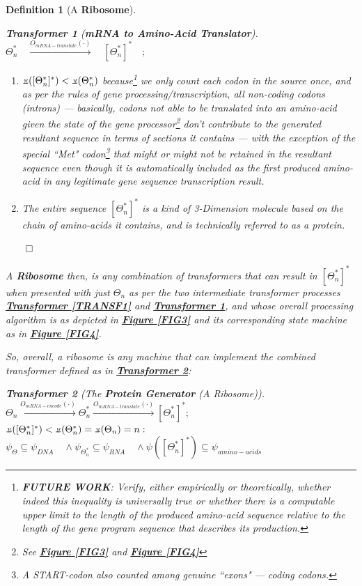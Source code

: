 \documentclass[a4paper, 18pt]{book} %
\newtheorem{defn}{Definition}
\newtheorem{transf}{Transformer}
\newcommand{\invpi}{\rotatebox[origin=c]{180}{$\pi$}}
\begin{document}
\begin{defn}[A \textbf{Ribosome}]
\begin{transf}[\textbf{mRNA to Amino-Acid Translator}]
\label{TRANSF2}
$ $\\
$\Theta^*_n \quad \xrightarrow{O_{mRNA-translate}(\cdot)} \quad [\Theta^*_n]^* \quad;$\\
\begin{enumerate}
\item $\invpi([\Theta^*_n]^*) < \invpi(\Theta^*_n)$ because\footnote{\textbf{FUTURE WORK}: Verify, either empirically or theoretically, whether indeed this inequality is universally true or whether there is a computable upper limit to the length of the produced amino-acid sequence relative to the length of the gene program sequence that describes its production.} we only count each codon in the source once, and as per the rules of gene processing/transcription, all non-coding codons (introns) --- basically, codons not able to be translated into an amino-acid given the state of the gene processor\footnote{See \textbf{\hyperref[FIG3]{Figure \ref{FIG3}}} and \textbf{\hyperref[FIG4]{Figure \ref{FIG4}}}} don't contribute to the generated resultant sequence in terms of sections it contains --- with the exception of the special ``Met" codon\footnote{A START-codon also counted among genuine ``exons" --- coding codons.} that might or might not be retained in the resultant sequence even though it is automatically included as the first produced amino-acid in any legitimate gene sequence transcription result.
\item The entire sequence $[\Theta^*_n]^*$ is a kind of 3-Dimension molecule based on the chain of amino-acids it contains, and is technically referred to as a protein.
\end{enumerate}
$\qed$
\end{transf}

A \textbf{Ribosome} then, is any combination of transformers that can result in $[\Theta^*_n]^*$ when presented with just $\Theta_n$ as per the two intermediate transformer processes \textbf{\hyperref[TRANSF1]{Transformer \ref{TRANSF1}}} and \textbf{\hyperref[TRANSF2]{Transformer \ref{TRANSF2}}}, and whose overall processing algorithm is as depicted in \textbf{\hyperref[FIG3]{Figure \ref{FIG3}}} and its corresponding state machine as in \textbf{\hyperref[FIG4]{Figure \ref{FIG4}}}. 

So, overall, a ribosome is any machine that can implement the combined transformer defined as in \textbf{\hyperref[TRANSF3]{Transformer \ref{TRANSF3}}}:

\begin{transf}[The \textbf{Protein Generator} (A Ribosome)]
\label{TRANSF3}
$ $\\
$\Theta_n  \xrightarrow{O_{mRNA-encode}(\cdot)}  \Theta^*_n  \xrightarrow{O_{mRNA-translate}(\cdot)} [\Theta^*_n]^*;$\\
$\invpi([\Theta^*_n]^*) < \invpi(\Theta^*_n) = \invpi(\Theta_n) = n:$\\
$\psi_{\Theta} \subseteq \psi_{DNA} \quad \land \psi_{\Theta^*_n} \subseteq \psi_{RNA} \quad \land \psi([\Theta^*_n]^*) \subseteq \psi_{amino-acids}$
\end{transf}


\end{defn}
\end{document}
